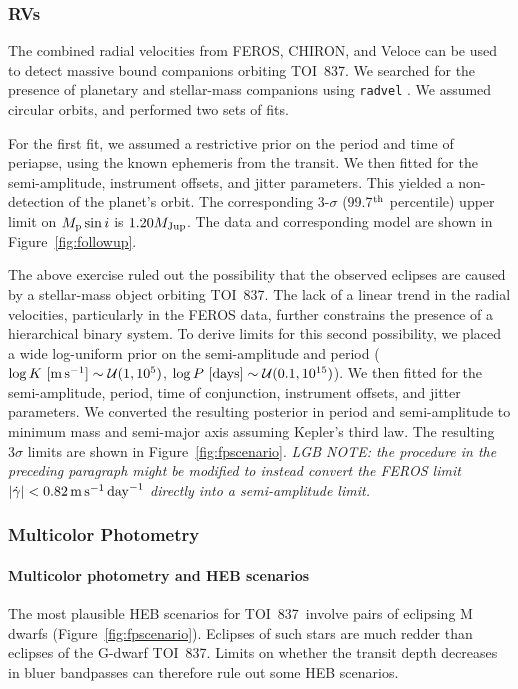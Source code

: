 \documentclass[12pt,twocolumn,tighten]{aastex63}
\newcommand{\tn}{TOI~837} %
\begin{document}
\subsubsection{RVs}
The combined radial velocities from FEROS, CHIRON, and Veloce can be
used to detect massive bound companions orbiting \tn.  We searched for
the presence of planetary and stellar-mass companions using
\texttt{radvel} \citep{fulton_radvel_2018}.  We assumed circular
orbits, and performed two sets of fits.

For the first fit, we assumed a restrictive prior on the period and
time of periapse, using the known ephemeris from the transit.  We then
fitted for the semi-amplitude, instrument offsets, and jitter
parameters.  This yielded a non-detection of the planet's orbit.  The
corresponding 3-$\sigma$ (99.7$^{\rm th}$ percentile) upper limit on
$M_{\rm p} \sin i$ is $1.20 M_{\rm Jup}$.  The data and corresponding
model are shown in Figure~\ref{fig:followup}.


The above exercise ruled out the possibility that the observed
eclipses are caused by a stellar-mass object orbiting \tn.  The lack
of a linear trend in the radial velocities, particularly in the FEROS
data, further constrains the presence of a hierarchical binary system.
To derive limits for this second possibility, we placed a wide
log-uniform prior on the semi-amplitude and period ($\log K\ [{\rm
m\,s^{-1}}] \sim \mathcal{U}(1,10^5)$, $\log P\ [{\rm days}] \sim
\mathcal{U}(0.1, 10^{15})$).  We then fitted for the semi-amplitude,
period, time of conjunction, instrument offsets, and jitter
parameters.  We converted the resulting posterior in period and
semi-amplitude to minimum mass and semi-major axis assuming Kepler's
third law.  The resulting $3\sigma$ limits are shown in
Figure~\ref{fig:fpscenario}.
{\it LGB NOTE: the procedure in the preceding paragraph might be modified to
	instead convert the FEROS limit $|\dot{\gamma}| < 0.82\,{\rm m\,s}^{-1}\,{\rm
		day}^{-1}$ directly into a semi-amplitude limit.}

\subsubsection{Multicolor Photometry}
\label{subsec:colorphot}

\paragraph{Multicolor photometry and HEB scenarios}
The most plausible HEB scenarios for \tn\ involve pairs of eclipsing M
dwarfs (Figure~\ref{fig:fpscenario}).  Eclipses of such stars are much
redder than eclipses of the G-dwarf \tn.  Limits on whether the
transit depth decreases in bluer bandpasses can therefore rule out
some HEB scenarios.
\end{document}

